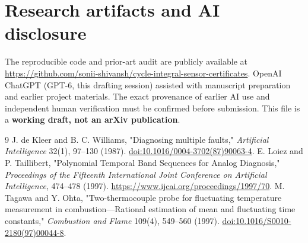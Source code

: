 \documentclass[11pt]{article}
\begin{document}
\section*{Research artifacts and AI disclosure}
The reproducible code and prior-art audit are publicly available at \url{https://github.com/sonii-shivansh/cycle-integral-sensor-certificates}. OpenAI ChatGPT (GPT-6, this drafting session) assisted with manuscript preparation and earlier project materials. The exact provenance of earlier AI use and independent human verification must be confirmed before submission. This file is a \textbf{working draft, not an arXiv publication}.
\begin{thebibliography}{9}
 J. de Kleer and B. C. Williams, "Diagnosing multiple faults," \emph{Artificial Intelligence} 32(1), 97--130 (1987). \href{https://doi.org/10.1016/0004-3702(87)90063-4}{doi:10.1016/0004-3702(87)90063-4}.
 E. Loiez and P. Taillibert, "Polynomial Temporal Band Sequences for Analog Diagnosis," \emph{Proceedings of the Fifteenth International Joint Conference on Artificial Intelligence}, 474--478 (1997). \url{https://www.ijcai.org/proceedings/1997/70}.
 M. Tagawa and Y. Ohta, "Two-thermocouple probe for fluctuating temperature measurement in combustion---Rational estimation of mean and fluctuating time constants," \emph{Combustion and Flame} 109(4), 549--560 (1997). \href{https://doi.org/10.1016/S0010-2180(97)00044-8}{doi:10.1016/S0010-2180(97)00044-8}.
\end{thebibliography}
\end{document}
